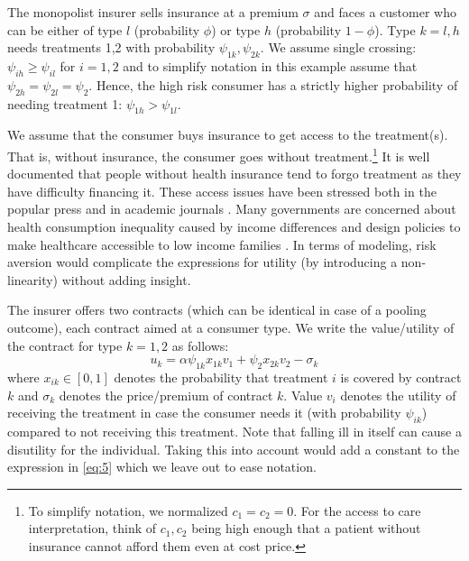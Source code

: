 \documentclass[a4paper,12pt]{article}
\begin{document}
The monopolist insurer sells insurance at a premium \(\sigma\) and faces a customer who can be either of type \(l\) (probability \(\phi\)) or type \(h\) (probability \(1-\phi\)). Type \(k=l,h\) needs treatments 1,2 with probability \(\psi_{1k},\psi_{2k}\). We assume single crossing: \(\psi_{ih} \geq \psi_{il}\) for \(i=1,2\) and to simplify notation in this example assume that \(\psi_{2h} = \psi_{2l} = \psi_2\). Hence, the high risk consumer has a strictly higher probability of needing treatment 1: \(\psi_{1h}>\psi_{1l}\).

We assume that the consumer buys insurance to get access to the treatment(s). That is, without insurance, the consumer goes without treatment.\footnote{To simplify notation, we normalized \(c_1=c_2=0\). For the access to care interpretation, think of \(c_1,c_2\) being high enough that a patient without insurance cannot afford them even at cost price.} It is well documented that people without health insurance tend to forgo treatment as they have difficulty financing it. These access issues have been stressed both in the popular press \citep{Cohn07} and in academic journals \citep{Nyman1999141,Schoen2008,Schoen2010a}. Many governments are concerned about health consumption inequality caused by income differences and design policies to make healthcare accessible to low income families \citep{Schokkaert2011o}. In terms of modeling, risk aversion would complicate the expressions for utility (by introducing a non-linearity) without adding insight.

The insurer offers two contracts (which can be identical in case of a pooling outcome), each contract aimed at a consumer type. We write the value/utility of the contract for type \(k=1,2\) as follows:
\begin{equation}
\label{eq:5}
u_{k} = \alpha \psi_{1k} x_{1k} v_1 + \psi_{2} x_{2k} v_2 - \sigma_k
\end{equation}
where \(x_{ik} \in [0,1]\) denotes the probability that treatment \(i\) is covered by contract \(k\) and \(\sigma_k\) denotes the price/premium of contract \(k\). Value \(v_i\) denotes the utility of receiving the treatment in case the consumer needs it (with probability \(\psi_{ik}\)) compared to not receiving this treatment. Note that falling ill in itself can cause a disutility for the individual. Taking this into account would add a constant to the expression in \eqref{eq:5} which we leave out to ease notation.
\end{document}
